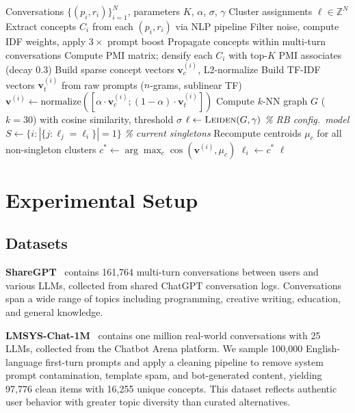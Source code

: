 \documentclass[conference]{IEEEtran}
\begin{document}
\begin{algorithm}[t]
\caption{Concept-kNN Pipeline}
\label{alg:pipeline}
\begin{algorithmic}[1]
\REQUIRE Conversations $\{(p_i, r_i)\}_{i=1}^{N}$, parameters $K$, $\alpha$, $\sigma$, $\gamma$
\ENSURE Cluster assignments $\ell \in \mathbb{Z}^N$
\STATE Extract concepts $C_i$ from each $(p_i, r_i)$ via NLP pipeline
\STATE Filter noise, compute IDF weights, apply $3\times$ prompt boost
\STATE Propagate concepts within multi-turn conversations
\STATE Compute PMI matrix; densify each $C_i$ with top-$K$ PMI associates (decay $0.3$)
\STATE Build sparse concept vectors $\mathbf{v}_c^{(i)}$, L2-normalize
\STATE Build TF-IDF vectors $\mathbf{v}_t^{(i)}$ from raw prompts ($n$-grams, sublinear TF)
\STATE $\mathbf{v}^{(i)} \leftarrow \text{normalize}([\alpha \cdot \mathbf{v}_c^{(i)} ; (1-\alpha) \cdot \mathbf{v}_t^{(i)}])$
\STATE Compute $k$-NN graph $G$ ($k\!=\!30$) with cosine similarity, threshold $\sigma$
\STATE $\ell \leftarrow \textsc{Leiden}(G, \gamma)$ \hfill \textit{\% RB config.\ model}
    \STATE $S \leftarrow \{i : |\{j : \ell_j = \ell_i\}| = 1\}$ \hfill \textit{\% current singletons}
    \STATE Recompute centroids $\mu_c$ for all non-singleton clusters
        \STATE $c^* \leftarrow \arg\max_c \cos(\mathbf{v}^{(i)}, \mu_c)$
            \STATE $\ell_i \leftarrow c^*$
        \ENDIF
    \ENDFOR
\ENDFOR
\RETURN $\ell$
\end{algorithmic}
\end{algorithm}

\section{Experimental Setup}

\subsection{Datasets}

\textbf{ShareGPT}~\cite{sharegpt} contains 161,764 multi-turn conversations between users and various LLMs, collected from shared ChatGPT conversation logs. Conversations span a wide range of topics including programming, creative writing, education, and general knowledge.

\textbf{LMSYS-Chat-1M}~\cite{zheng2024lmsys} contains one million real-world conversations with 25 LLMs, collected from the Chatbot Arena platform. We sample 100,000 English-language first-turn prompts and apply a cleaning pipeline to remove system prompt contamination, template spam, and bot-generated content, yielding 97,776 clean items with 16,255 unique concepts. This dataset reflects authentic user behavior with greater topic diversity than curated alternatives.
\end{document}
